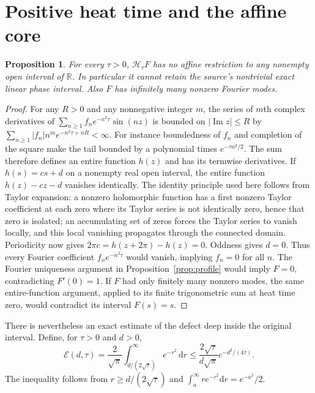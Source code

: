 \documentclass[11pt]{article}
\newtheorem{proposition}{Proposition}
\newcommand{\R}{\mathbb R}
\newcommand{\dd}{\mathrm d}
\newcommand{\Hs}{\mathcal H}
\begin{document}
\section{Positive heat time and the affine core}

\begin{proposition}\label{prop:analytic}
For every $\tau>0$, $\Hs_\tau F$ has no affine restriction to any nonempty
open interval of $\R$. In particular it cannot retain the source's
nontrivial exact linear phase interval. Also $F$ has infinitely many
nonzero Fourier modes.
\end{proposition}
\begin{proof}
For any $R>0$ and any nonnegative integer $m$, the series of $m$th complex
derivatives of
$\sum_{n\geq1}f_ne^{-n^2\tau}\sin(nz)$ is bounded on
$|\operatorname{Im}z|\leq R$ by
$\sum_{n\geq1}|f_n|n^me^{-n^2\tau+nR}<\infty$.
For instance boundedness of $f_n$ and completion of the square make the
tail bounded by a polynomial times $e^{-\tau n^2/2}$.
The sum therefore defines an entire function $h(z)$ and has its
termwise derivatives. If $h(s)=cs+d$ on a nonempty real open interval,
the entire function $h(z)-cz-d$ vanishes identically. The identity
principle used here follows from Taylor expansion: a nonzero holomorphic
function has a first nonzero Taylor coefficient at each zero where its
Taylor series is not identically zero, hence that zero is isolated;
an accumulating set of zeros forces the Taylor series to vanish locally,
and this local vanishing propagates through the connected domain.
Periodicity now gives $2\pi c=h(z+2\pi)-h(z)=0$. Oddness gives $d=0$.
Thus every Fourier coefficient $f_ne^{-n^2\tau}$ would vanish, implying
$f_n=0$ for all $n$. The Fourier uniqueness argument in
Proposition~\ref{prop:profile} would imply $F=0$, contradicting $F'(0)=1$.
If $F$ had only finitely many nonzero modes, the same entire-function
argument, applied to its finite trigonometric sum at heat time zero,
would contradict its interval $F(s)=s$.
\end{proof}

There is nevertheless an exact estimate of the defect deep inside the
original interval. Define, for $\tau>0$ and $d>0$,
\begin{equation}\label{eq:tail}
 \mathcal E(d,\tau)=\frac{2}{\sqrt\pi}
          \int_{d/(2\sqrt\tau)}^\infty e^{-r^2}\,\dd r
 \leq\frac{2\sqrt\tau}{d\sqrt\pi}e^{-d^2/(4\tau)}.
\end{equation}
The inequality follows from $r\geq d/(2\sqrt\tau)$ and
$\int_a^\infty r e^{-r^2}\dd r=e^{-a^2}/2$.
\end{document}
